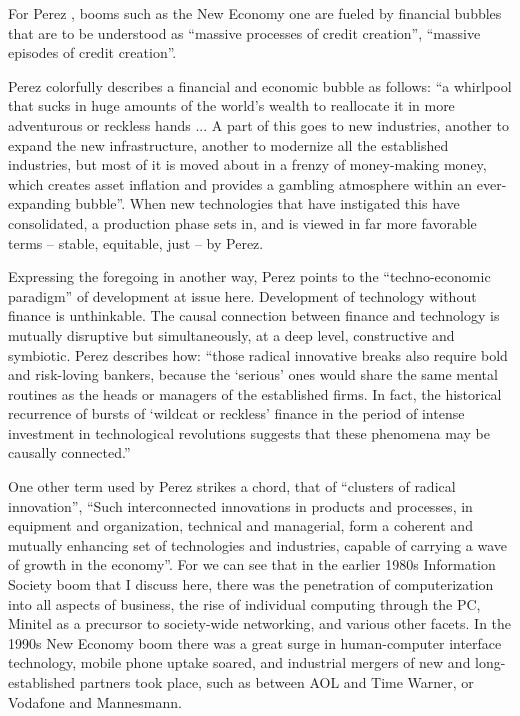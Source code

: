 \documentclass{article}
\begin{document}
For Perez \cite{perez1,perez2}, booms such as the New Economy one are 
fueled by financial bubbles that are to be understood as 
 ``massive processes of credit creation'', ``massive episodes of 
credit creation''. 

Perez \cite{perez0} colorfully describes a financial and economic bubble 
as follows:  ``a whirlpool that sucks in huge amounts of the world's
wealth to reallocate it in more adventurous or reckless hands ... A 
part of this goes to new industries, another to expand the new 
infrastructure, another to modernize all the established industries,
but most of it is moved about in a frenzy of money-making money,
which creates asset inflation and provides a gambling atmosphere 
within an ever-expanding bubble''.  When new technologies that 
have instigated this have consolidated, a production phase sets 
in, and is viewed in far more favorable terms -- stable, 
equitable, just -- by Perez.  

Expressing the foregoing in another way, Perez points to the 
``techno-economic paradigm'' of development at issue here.  
Development of technology without finance is unthinkable. 
The causal connection between finance and technology is mutually
disruptive but simultaneously, at a deep level, constructive
and symbiotic.  Perez \cite{perez2} describes how: ``those radical 
innovative breaks also require bold and risk-loving bankers,
because the `serious' ones would share the same mental routines 
as the heads or managers of the established firms.  In fact, 
the historical recurrence of bursts of `wildcat or reckless' 
finance in the period of intense investment in technological 
revolutions suggests that these phenomena may be causally 
connected.''  

One other term used by Perez strikes a chord, that of ``clusters 
of radical innovation'',  ``Such interconnected innovations in products and processes, 
in equipment and organization, technical and managerial, form a 
coherent and mutually enhancing set of technologies and industries,
capable of carrying a wave of growth in the economy''.  For we can see that in the earlier 1980s
Information Society boom that I discuss here, there was
the penetration of computerization into all aspects of business,
the rise of individual computing through the PC, Minitel as a 
precursor to society-wide networking, and various other facets.
In the 1990s New Economy boom there was a great surge in 
human-computer interface technology, mobile phone uptake soared, 
and industrial mergers of new and long-established partners took 
place, such as between 
AOL and Time Warner, or Vodafone and Mannesmann.  
\end{document}
